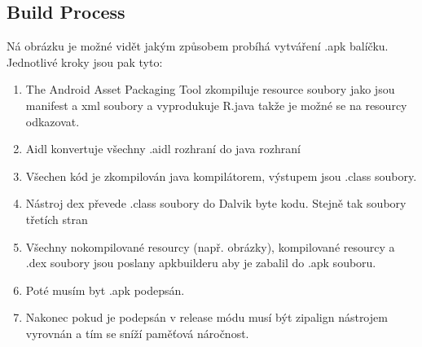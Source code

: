 \subsection{Build Process}
Ná obrázku je možné vidět jakým způsobem probíhá vytváření .apk balíčku. Jednotlivé kroky jsou pak tyto:
\begin{enumerate}
\item The Android Asset Packaging Tool zkompiluje resource soubory jako jsou manifest a xml soubory a vyprodukuje R.java takže je možné se na resourcy odkazovat.
\item Aidl konvertuje všechny .aidl rozhraní do java rozhraní
\item Všechen kód je zkompilován java kompilátorem, výstupem jsou .class soubory.
\item Nástroj dex převede .class soubory do Dalvik byte kodu. Stejně tak soubory třetích stran
\item Všechny nokompilované resourcy (např. obrázky), kompilované resourcy a .dex soubory jsou poslany apkbuilderu aby je zabalil do .apk souboru.
\item Poté musím byt .apk podepsán.
\item Nakonec pokud je podepsán v release módu musí být zipalign nástrojem vyrovnán a tím se sníží paměťová náročnost.
\end{enumerate}

